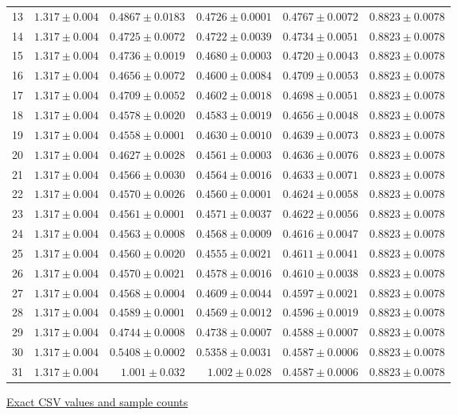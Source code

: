 \begin{center}
{\begin{tabular}{lrrrrr}
13 & $1.317\pm0.004$ & $0.4867\pm0.0183$ & $0.4726\pm0.0001$ & $0.4767\pm0.0072$ & $0.8823\pm0.0078$ \\
14 & $1.317\pm0.004$ & $0.4725\pm0.0072$ & $0.4722\pm0.0039$ & $0.4734\pm0.0051$ & $0.8823\pm0.0078$ \\
15 & $1.317\pm0.004$ & $0.4736\pm0.0019$ & $0.4680\pm0.0003$ & $0.4720\pm0.0043$ & $0.8823\pm0.0078$ \\
16 & $1.317\pm0.004$ & $0.4656\pm0.0072$ & $0.4600\pm0.0084$ & $0.4709\pm0.0053$ & $0.8823\pm0.0078$ \\
17 & $1.317\pm0.004$ & $0.4709\pm0.0052$ & $0.4602\pm0.0018$ & $0.4698\pm0.0051$ & $0.8823\pm0.0078$ \\
18 & $1.317\pm0.004$ & $0.4578\pm0.0020$ & $0.4583\pm0.0019$ & $0.4656\pm0.0048$ & $0.8823\pm0.0078$ \\
19 & $1.317\pm0.004$ & $0.4558\pm0.0001$ & $0.4630\pm0.0010$ & $0.4639\pm0.0073$ & $0.8823\pm0.0078$ \\
20 & $1.317\pm0.004$ & $0.4627\pm0.0028$ & $0.4561\pm0.0003$ & $0.4636\pm0.0076$ & $0.8823\pm0.0078$ \\
21 & $1.317\pm0.004$ & $0.4566\pm0.0030$ & $0.4564\pm0.0016$ & $0.4633\pm0.0071$ & $0.8823\pm0.0078$ \\
22 & $1.317\pm0.004$ & $0.4570\pm0.0026$ & $0.4560\pm0.0001$ & $0.4624\pm0.0058$ & $0.8823\pm0.0078$ \\
23 & $1.317\pm0.004$ & $0.4561\pm0.0001$ & $0.4571\pm0.0037$ & $0.4622\pm0.0056$ & $0.8823\pm0.0078$ \\
24 & $1.317\pm0.004$ & $0.4563\pm0.0008$ & $0.4568\pm0.0009$ & $0.4616\pm0.0047$ & $0.8823\pm0.0078$ \\
25 & $1.317\pm0.004$ & $0.4560\pm0.0020$ & $0.4555\pm0.0021$ & $0.4611\pm0.0041$ & $0.8823\pm0.0078$ \\
26 & $1.317\pm0.004$ & $0.4570\pm0.0021$ & $0.4578\pm0.0016$ & $0.4610\pm0.0038$ & $0.8823\pm0.0078$ \\
27 & $1.317\pm0.004$ & $0.4568\pm0.0004$ & $0.4609\pm0.0044$ & $0.4597\pm0.0021$ & $0.8823\pm0.0078$ \\
28 & $1.317\pm0.004$ & $0.4589\pm0.0001$ & $0.4569\pm0.0012$ & $0.4596\pm0.0019$ & $0.8823\pm0.0078$ \\
29 & $1.317\pm0.004$ & $0.4744\pm0.0008$ & $0.4738\pm0.0007$ & $0.4588\pm0.0007$ & $0.8823\pm0.0078$ \\
30 & $1.317\pm0.004$ & $0.5408\pm0.0002$ & $0.5358\pm0.0031$ & $0.4587\pm0.0006$ & $0.8823\pm0.0078$ \\
31 & $1.317\pm0.004$ & $1.001\pm0.032$ & $1.002\pm0.028$ & $0.4587\pm0.0006$ & $0.8823\pm0.0078$ \\
\bottomrule\end{tabular}}
{\footnotesize\href{https://github.com/sanjeevkrishnaa/Compiler-Driven-ACE/blob/codex/ace-scheduler-correctness/docs/latex/qft96_final/data/allocation_mesh_xy_m32.csv}{Exact CSV values and sample counts}}
\end{center}
